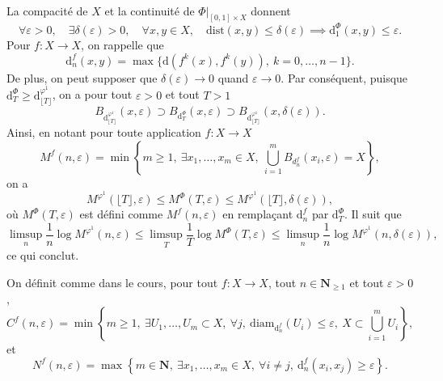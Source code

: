 \documentclass[a4paper,12pt,openany]{article}
\theoremstyle{plain}
\theoremstyle{definition}
\newcommand{\dd}{\mathrm{d}}
\newcommand{\N}{\mathbf{N}}
\begin{document}
 \vspace{1.5mm} \\
\noindent La compacit\'e de $X$ et la continuit\'e de $\Phi|_{[0,1] \times X}$ donnent
$$
\forall \varepsilon > 0, \quad \exists \delta(\varepsilon) > 0, \quad \forall x,y \in X, \quad \mathrm{dist}(x,y) \leqslant \delta(\varepsilon) \implies \mathrm{d}^\Phi_1(x,y) \leqslant \varepsilon.
$$
Pour $f : X\to X$, on rappelle que
$$
\dd^{f}_n(x,y) = \max \{ \dd(f^k(x), f^k(y)),~k = 0, \dots, n-1\}.
$$
De plus, on peut supposer que $\delta(\varepsilon) \to 0$ quand $\varepsilon \to 0$. Par cons\'equent, puisque $\dd_T^\Phi \geqslant \dd_{\lfloor T \rfloor}^{\varphi^1}$, on a pour tout $\varepsilon > 0$ et tout $T > 1$
$$
B_{\dd^{\varphi^1}_{\lfloor T \rfloor}}(x, \varepsilon) \supset B_{\dd^\Phi_T}(x, \varepsilon) \supset B_{\dd^{\varphi^1}_{\lfloor T \rfloor}}(x, \delta(\varepsilon)).
$$
Ainsi, en notant pour toute application $f : X \to X$
$$
M^{f}(n, \varepsilon) = \min \left\{m \geqslant 1,~ \exists x_1, \dots, x_m \in X,~\bigcup_{i=1}^m B_{d^{f}_n}(x_i, \varepsilon) = X\right\},
$$
on a
$$
M^{\varphi^1}(\lfloor T \rfloor, \varepsilon) \leqslant M^{\Phi}(T, \varepsilon) \leqslant M^{\varphi^1}(\lfloor T \rfloor, \delta(\varepsilon)),
$$
o\`u $M^{\Phi}(T, \varepsilon)$ est d\'efini comme $M^f(n, \varepsilon)$ en rempla\c{c}ant $\dd^f_n$ par $\dd^\Phi_T$. Il suit que 
$$
\limsup_n \frac{1}{n} \log M^{\varphi^1}(n, \varepsilon) \leqslant \limsup_T \frac{1}{T} \log  M^{\Phi}(T, \varepsilon) \leqslant \limsup_n \frac{1}{n} \log M^{\varphi^1}(n, \delta(\varepsilon)),
$$
ce qui conclut.

\vspace{0.6cm}

 \vspace{1.5mm} 

On d\'efinit comme dans le cours, pour tout $f : X \to X$, tout $n \in \N_{\geqslant 1}$ et tout $\varepsilon > 0$,
$$
C^f(n, \varepsilon) = \min \left\{ m \geqslant 1,~\exists U_1, \dots, U_m \subset X,~\forall j,~\mathrm{diam}_{\dd^f_n}(U_i) \leqslant \varepsilon, ~X \subset \bigcup_{i=1}^m U_i \right\},$$
et 
$$
N^f(n, \varepsilon) = \max \left\{ m \in \N,~ \exists x_1, \dots, x_m \in X,~\forall i \neq j,~\dd^f_n(x_i, x_j) \geqslant \varepsilon \right\}.
$$
\end{document}
